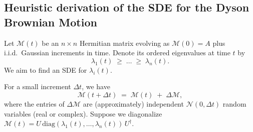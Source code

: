 \documentclass[letterpaper,11pt,oneside,reqno]{book}
\numberwithin{equation}{chapter}  %
\theoremstyle{definition}
\begin{document}
\subsection{Heuristic derivation of the SDE for the Dyson Brownian Motion}

Let $\mathcal{M}(t)$ be an $n\times n$ Hermitian matrix evolving as $\mathcal{M}(0)=A$ plus i.i.d.\ Gaussian increments in time. Denote its ordered eigenvalues at time $t$ by
\[
\lambda_1(t)\;\ge\;\dots\;\ge\;\lambda_n(t).
\]
We aim to find an SDE for $\lambda_i(t)$.

For a small increment $\Delta t$, we have
\[
\mathcal{M}(t+\Delta t)
\;=\;
\mathcal{M}(t)\;+\;\Delta \mathcal{M},
\]
where the entries of $\Delta \mathcal{M}$ are (approximately) independent $\mathcal{N}(0,\Delta t)$ random variables (real or complex). Suppose we diagonalize $\mathcal{M}(t)=U\,\mathrm{diag}(\lambda_1(t),\dots,\lambda_n(t))\,U^\dagger$.
\end{document}
